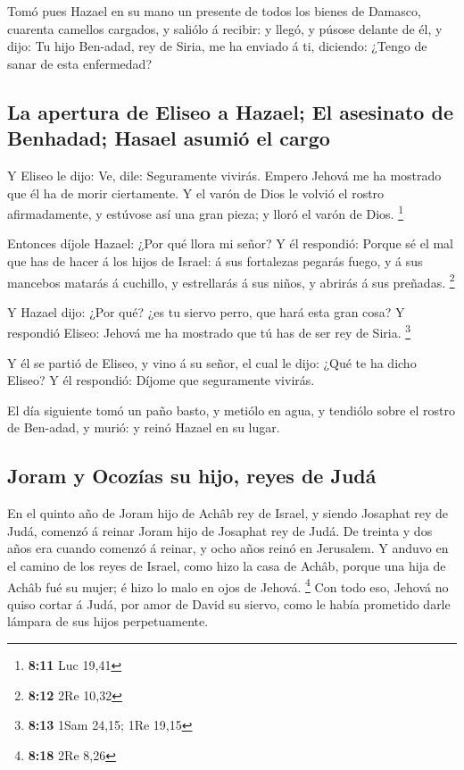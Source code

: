  Tomó pues Hazael en su mano un presente de todos los bienes
de Damasco, cuarenta camellos cargados, y saliólo á recibir: y llegó, y
púsose delante de él, y dijo: Tu hijo Ben-adad, rey de Siria, me ha
enviado á ti, diciendo: ¿Tengo de sanar de esta enfermedad?

\hypertarget{la-apertura-de-eliseo-a-hazael-el-asesinato-de-benhadad-hasael-asumiuxf3-el-cargo}{%
\subsection{La apertura de Eliseo a Hazael; El asesinato de Benhadad;
Hasael asumió el
cargo}\label{la-apertura-de-eliseo-a-hazael-el-asesinato-de-benhadad-hasael-asumiuxf3-el-cargo}}

 Y Eliseo le dijo: Ve, dile: Seguramente vivirás. Empero
Jehová me ha mostrado que él ha de morir ciertamente.  Y el
varón de Dios le volvió el rostro afirmadamente, y estúvose así una gran
pieza; y lloró el varón de Dios. \footnote{\textbf{8:11} Luc 19,41}

 Entonces díjole Hazael: ¿Por qué llora mi señor? Y él
respondió: Porque sé el mal que has de hacer á los hijos de Israel: á
sus fortalezas pegarás fuego, y á sus mancebos matarás á cuchillo, y
estrellarás á sus niños, y abrirás á sus preñadas. \footnote{\textbf{8:12}
  2Re 10,32}

 Y Hazael dijo: ¿Por qué? ¿es tu siervo perro, que hará
esta gran cosa? Y respondió Eliseo: Jehová me ha mostrado que tú has de
ser rey de Siria. \footnote{\textbf{8:13} 1Sam 24,15; 1Re 19,15}

 Y él se partió de Eliseo, y vino á su señor, el cual le
dijo: ¿Qué te ha dicho Eliseo? Y él respondió: Díjome que seguramente
vivirás.

 El día siguiente tomó un paño basto, y metiólo en agua, y
tendiólo sobre el rostro de Ben-adad, y murió: y reinó Hazael en su
lugar.

\hypertarget{joram-y-ocozuxedas-su-hijo-reyes-de-juduxe1}{%
\subsection{Joram y Ocozías su hijo, reyes de
Judá}\label{joram-y-ocozuxedas-su-hijo-reyes-de-juduxe1}}

 En el quinto año de Joram hijo de Achâb rey de Israel, y
siendo Josaphat rey de Judá, comenzó á reinar Joram hijo de Josaphat rey
de Judá.  De treinta y dos años era cuando comenzó á
reinar, y ocho años reinó en Jerusalem.  Y anduvo en el
camino de los reyes de Israel, como hizo la casa de Achâb, porque una
hija de Achâb fué su mujer; é hizo lo malo en ojos de Jehová.
\footnote{\textbf{8:18} 2Re 8,26}  Con todo eso, Jehová no
quiso cortar á Judá, por amor de David su siervo, como le había
prometido darle lámpara de sus hijos perpetuamente.

